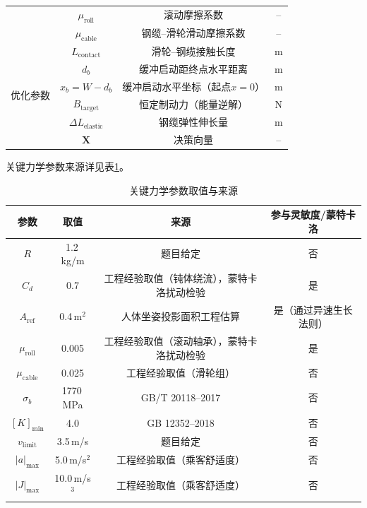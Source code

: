 \documentclass[12pt,a4paper]{ctexart}
\begin{document}
\begin{table}[H]
\begin{tabular}{c|c|c|c}
      & $\mu_{\text{roll}}$ & 滚动摩擦系数 & -- \\
      & $\mu_{\text{cable}}$ & 钢缆--滑轮滑动摩擦系数 & -- \\
      & $L_{\text{contact}}$ & 滑轮--钢缆接触长度 & m \\
    \midrule
    \multirow{4}{*}{优化参数}
      & $d_b$ & 缓冲启动距终点水平距离 & m \\
      & $x_b = W-d_b$ & 缓冲启动水平坐标（起点$x=0$） & m \\
      & $B_{\text{target}}$   & 恒定制动力（能量逆解） & N \\
      & $\Delta L_{\text{elastic}}$ & 钢缆弹性伸长量 & m \\
      & $\mathbf{X}$         & 决策向量 & -- \\
    \bottomrule
  \end{tabular}
\end{table}

关键力学参数来源详见表\ref{tab:param_sources}。

\begin{table}[H]
  \centering
  \caption{关键力学参数取值与来源}
  \label{tab:param_sources}
  \renewcommand{\arraystretch}{1.2}
  \begin{tabular}{c|c|c|c}
    \toprule
    \textbf{参数} & \textbf{取值} & \textbf{来源} & \textbf{参与灵敏度/蒙特卡洛} \\
    \midrule
    $R$ & 1.2\,kg/m & 题目给定 & 否 \\
    $C_d$ & 0.7 & 工程经验取值（钝体绕流），蒙特卡洛扰动检验 & 是 \\
    $A_{\text{ref}}$ & 0.4\,m$^2$ & 人体坐姿投影面积工程估算 & 是（通过异速生长法则） \\
    $\mu_{\text{roll}}$ & 0.005 & 工程经验取值（滚动轴承），蒙特卡洛扰动检验 & 是 \\
    $\mu_{\text{cable}}$ & 0.025 & 工程经验取值（滑轮组） & 否 \\
    $\sigma_b$ & 1770\,MPa & GB/T 20118--2017\cite{GB-T20118} & 否 \\
    $[K]_{\min}$ & 4.0 & GB 12352--2018\cite{GB12352} & 否 \\
    $v_{\text{limit}}$ & 3.5\,m/s & 题目给定 & 否 \\
    $|a|_{\max}$ & 5.0\,m/s$^2$ & 工程经验取值（乘客舒适度） & 否 \\
    $|J|_{\max}$ & 10.0\,m/s$^3$ & 工程经验取值（乘客舒适度） & 否 \\
    \bottomrule
  \end{tabular}
\end{table}
\end{document}
